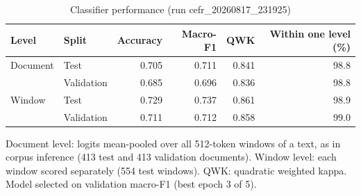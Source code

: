 \begin{table}[htbp]
\centering
\begin{threeparttable}
\caption{Classifier performance (run cefr\_20260817\_231925)}
\label{tab:clf-metrics}
\begin{tabular}{llrrrr}
\hline
Level & Split & Accuracy & Macro-F1 & QWK & Within one level (\%) \\
\hline
Document & Test & 0.705 & 0.711 & 0.841 & 98.8 \\
 & Validation & 0.685 & 0.696 & 0.836 & 98.8 \\
\hline
Window & Test & 0.729 & 0.737 & 0.861 & 98.9 \\
 & Validation & 0.711 & 0.712 & 0.858 & 99.0 \\
\hline
\end{tabular}
\begin{tablenotes}
\footnotesize
\item Document level: logits mean-pooled over all 512-token windows of a text, as in corpus inference (413 test and 413 validation documents). Window level: each window scored separately (554 test windows). QWK: quadratic weighted kappa. Model selected on validation macro-F1 (best epoch 3 of 5).
\end{tablenotes}
\end{threeparttable}
\end{table}
